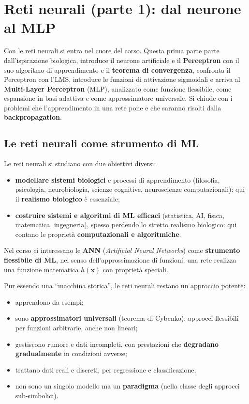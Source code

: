 \chapter{Reti neurali (parte 1): dal neurone al MLP}\label{ch-06}

Con le reti neurali si entra nel cuore del corso. Questa prima parte
parte dall'ispirazione biologica, introduce il neurone artificiale e il
\textbf{Perceptron} con il suo algoritmo di apprendimento e il
\textbf{teorema di convergenza}, confronta il Perceptron con l'LMS,
introduce le funzioni di attivazione sigmoidali e arriva al
\textbf{Multi-Layer Perceptron} (MLP), analizzato come funzione
flessibile, come espansione in basi adattiva e come approssimatore
universale. Si chiude con i problemi che l'apprendimento in una rete
pone e che saranno risolti dalla \textbf{backpropagation}.

\section{Le reti neurali come strumento di
ML}\label{le-reti-neurali-come-strumento-di-ml}

Le reti neurali si studiano con due obiettivi diversi:

\begin{itemize}
\tightlist
\item
  \textbf{modellare sistemi biologici} e processi di apprendimento
  (filosofia, psicologia, neurobiologia, scienze cognitive, neuroscienze
  computazionali): qui il \textbf{realismo biologico} è essenziale;
\item
  \textbf{costruire sistemi e algoritmi di ML efficaci} (statistica, AI,
  fisica, matematica, ingegneria), spesso perdendo lo stretto realismo
  biologico: qui contano le proprietà \textbf{computazionali e
  algoritmiche}.
\end{itemize}

Nel corso ci interessano le \textbf{ANN} (\emph{Artificial Neural
Networks}) come \textbf{strumento flessibile di ML}, nel senso
dell'approssimazione di funzioni: una rete realizza una funzione
matematica \(h(\mathbf{x})\) con proprietà speciali.

Pur essendo una ``macchina storica'', le reti neurali restano un
approccio potente:

\begin{itemize}
\tightlist
\item
  apprendono da esempi;
\item
  sono \textbf{approssimatori universali} (teorema di Cybenko): approcci
  flessibili per funzioni arbitrarie, anche non lineari;
\item
  gestiscono rumore e dati incompleti, con prestazioni che
  \textbf{degradano gradualmente} in condizioni avverse;
\item
  trattano dati reali e discreti, per regressione e classificazione;
\item
  non sono un singolo modello ma un \textbf{paradigma} (nella classe
  degli approcci sub-simbolici).
\end{itemize}

